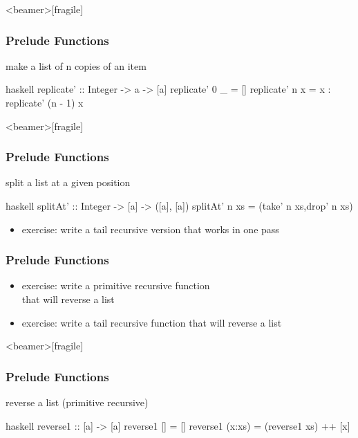 \documentclass[dvipsnames]{beamer}
\theoremstyle{plain}
\begin{document}
\begin{frame}<beamer>[fragile]
  \frametitle{Prelude Functions}

  \begin{exampleblock}{make a list of n copies of an item}
    \begin{pygments}{haskell}
replicate' :: Integer -> a -> [a]
replicate' 0 _ = []
replicate' n x = x : replicate' (n - 1) x
    \end{pygments}
  \end{exampleblock}
\end{frame}

\begin{frame}<beamer>[fragile]
  \frametitle{Prelude Functions}

  \begin{exampleblock}{split a list at a given position}
    \begin{pygments}{haskell}
splitAt' :: Integer -> [a] -> ([a], [a])
splitAt' n xs = (take' n xs,drop' n xs)
    \end{pygments}
  \end{exampleblock}

  \pause
  \begin{itemize}
    \item exercise: write a tail recursive version that works in one pass
  \end{itemize}
\end{frame}

\begin{frame}
  \frametitle{Prelude Functions}

  \begin{itemize}
    \item exercise: write a primitive recursive function\\
      that will reverse a list
    \item exercise: write a tail recursive function that will reverse a list
  \end{itemize}
\end{frame}

\begin{frame}<beamer>[fragile]
  \frametitle{Prelude Functions}

  \begin{exampleblock}{reverse a list (primitive recursive)}
    \begin{pygments}{haskell}
reverse1 :: [a] -> [a]
reverse1 [] = []
reverse1 (x:xs) = (reverse1 xs) ++ [x]
    \end{pygments}
  \end{exampleblock}
\end{frame}
\end{document}
